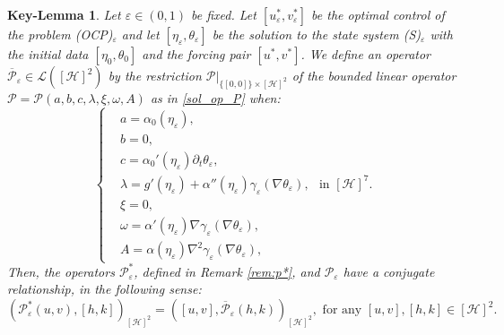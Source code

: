 \documentclass{sinst}
\numberwithin{equation}{section}
\theoremstyle{plain}
\newtheorem{keylem}{Key-Lemma}
\theoremstyle{definition}
\def\sH{\mathscr{H}}
\def\sL{\mathscr{L}}
\def\sP{\mathscr{P}}
\begin{document}
\begin{keylem} \label{lem:conj}
  Let $\varepsilon \in (0,1)$ be fixed. Let $[u_\varepsilon^*, v_\varepsilon^*]$ be the optimal control of the problem (OCP)$_\varepsilon$ and let $[\eta_\varepsilon, \theta_\varepsilon]$ be the solution to the state system (S)$_\varepsilon$ with the initial data $[\eta_0, \theta_0]$ and the forcing pair $[u^*,v^*]$. We define an operator $\overline{\sP}_\varepsilon \in \sL([\sH]^2)$ by the restriction $\sP|_{\{ [0,0] \} \times [\sH]^2}$ of the bounded linear operator $\sP = \sP(a,b,c,\lambda,\xi,\omega,A)$ as in \eqref{sol_op_P} when:
  \begin{equation}
    \left\{ \begin{aligned}
      &a = \alpha_0(\eta_\varepsilon),
      \\
      &b = 0,
      \\
      &c = \alpha_0'(\eta_\varepsilon) \partial_t \theta_\varepsilon,
      \\
      &\lambda = g'(\eta_\varepsilon) + \alpha''(\eta_\varepsilon) \gamma_\varepsilon(\nabla \theta_\varepsilon),
      \\
      &\xi = 0,
      \\
      &\omega = \alpha'(\eta_\varepsilon) \nabla \gamma_\varepsilon(\nabla \theta_\varepsilon),
      \\
      &A = \alpha(\eta_\varepsilon) \nabla^2 \gamma_\varepsilon(\nabla \theta_\varepsilon),
    \end{aligned} \right. \mbox{ in } [\sH]^7.
  \end{equation}
  Then, the operators $\sP_\varepsilon^*$, defined in Remark \ref{rem:p*}, and $\sP_\varepsilon$ have a conjugate relationship, in the following sense:
  \begin{equation}
    (\sP_\varepsilon^*(u,v),[h,k])_{[\sH]^2} = ([u,v], \overline{\sP}_\varepsilon(h,k))_{[\sH]^2}, \mbox{ for any } [u,v], [h,k] \in [\sH]^2.
  \end{equation}
\end{keylem}
\end{document}
